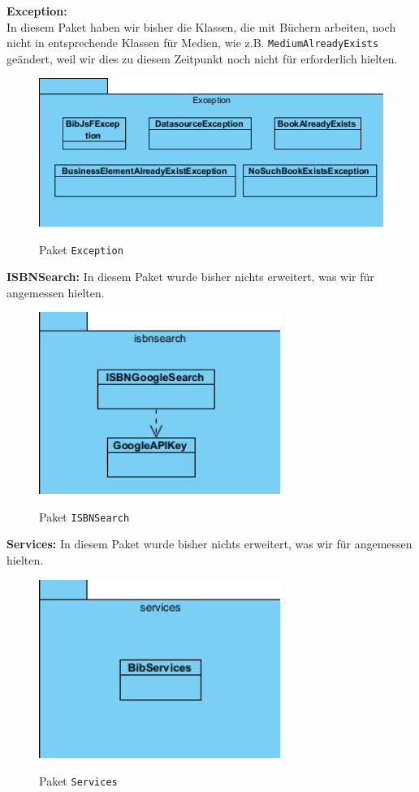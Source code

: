 \documentclass[fontsize=12pt,paper=a4,twoside]{scrartcl}
\begin{document}
\textbf{Exception:} \\
In diesem Paket haben wir bisher die Klassen, die mit Büchern arbeiten, noch nicht in entsprechende Klassen für Medien, wie z.B. \texttt{MediumAlreadyExists} geändert, weil wir dies zu diesem Zeitpunkt noch nicht für erforderlich hielten.
\begin{figure} [H] 
\caption{Paket \texttt{Exception}} \centering
 \includegraphics[width=1\textwidth]{Diagramme/exception.png} 
 \label{Exception} 
\end{figure}

\textbf{ISBNSearch:}
In diesem Paket wurde bisher nichts erweitert, was wir für angemessen hielten.
\begin{figure} [H] 
\caption{Paket \texttt{ISBNSearch}} \centering
 \includegraphics[width=0.7\textwidth]{Diagramme/ISBNSearch.png} 
 \label{ISBNSearch} 
\end{figure}

\textbf{Services:}
In diesem Paket wurde bisher nichts erweitert, was wir für angemessen hielten.
\begin{figure} [H] 
\caption{Paket \texttt{Services}} \centering
 \includegraphics[width=0.7\textwidth]{Diagramme/services.png} 
 \label{Services} 
\end{figure}
\end{document}
